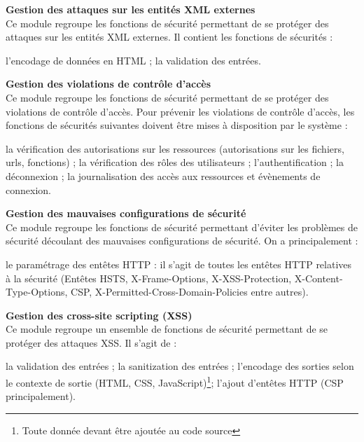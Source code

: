 \textbf{\RIGHTarrow Gestion des attaques sur les entités XML externes}\\
Ce module regroupe les fonctions de sécurité permettant de se protéger des attaques sur les entités XML externes. Il contient les fonctions de sécurités :
\begin{itemize}
	\itemcheck l'encodage de données en HTML ;
	\itemcheck la validation des entrées.\\
\end{itemize}

\textbf{\RIGHTarrow Gestion des violations de contrôle d’accès}\\
Ce module regroupe les fonctions de sécurité permettant de se protéger des violations de contrôle d'accès. Pour prévenir les violations de contrôle d'accès, les fonctions de sécurités suivantes doivent être mises à disposition par le système :
\begin{itemize}
	\itemcheck la vérification des autorisations sur les ressources (autorisations sur les fichiers, urls, fonctions) ; 
	\itemcheck la vérification des rôles des utilisateurs ; 
	\itemcheck l'authentification ; 
	\itemcheck la déconnexion ; 
	\itemcheck la journalisation des accès aux ressources et évènements de connexion.\\
\end{itemize}

\textbf{\RIGHTarrow Gestion des mauvaises configurations de sécurité}\\
Ce module regroupe les fonctions de sécurité permettant d'éviter les problèmes de sécurité découlant des mauvaises configurations de sécurité. On a principalement :
\begin{itemize}
	\itemcheck le paramétrage des entêtes HTTP : il s'agit de toutes les entêtes HTTP relatives à la sécurité (Entêtes HSTS, X-Frame-Options, X-XSS-Protection, X-Content-Type-Options, CSP, X-Permitted-Cross-Domain-Policies entre autres). \\
\end{itemize}

\textbf{\RIGHTarrow Gestion des cross-site scripting (XSS)}\\
Ce module regroupe un ensemble de fonctions de sécurité permettant de se protéger des attaques XSS. Il s'agit de :
\begin{itemize}
	\itemcheck la validation des entrées ;
	\itemcheck la sanitization des entrées ;
	\itemcheck l'encodage des sorties selon le contexte de sortie (HTML, CSS, JavaScript)\footnote{Toute donnée devant être ajoutée au code source};
	\itemcheck l'ajout d'entêtes HTTP (CSP principalement).\\
\end{itemize}

